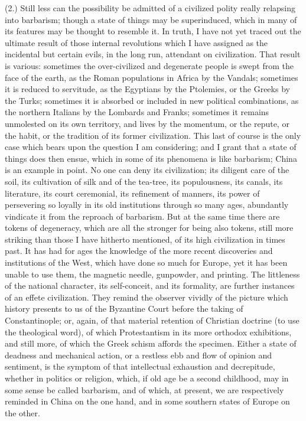 (2.) Still less can the
possibility be admitted of a civilized polity really relapsing into
barbarism; though a state of things may be superinduced, which in many
of its features may be thought to resemble it. In truth, I have not
yet traced out the ultimate result of those internal revolutions which
I have assigned as the incidental but certain evils, in the long run,
attendant on civilization. That result is various: sometimes the
over-civilized and degenerate people is swept from the face of the
earth, as the Roman populations in Africa by the Vandals; sometimes it
is reduced to servitude, as the Egyptians by the Ptolemies, or the
Greeks by the Turks; sometimes it is absorbed or included in new
political combinations, as the northern Italians by the Lombards and
Franks; sometimes it remains unmolested on its own territory, and
lives by the momentum, or the repute, or the habit, or the
tradition of its former civilization. This last of course is the only
case which bears upon the question I am considering; and I grant that
a state of things does then ensue, which in some of its phenomena is
like barbarism; China is an example in point. No one can deny its
civilization; its diligent care of the soil, its cultivation of silk
and of the tea-tree, its populousness, its canals, its literature, its
court ceremonial, its refinement of manners, its power of persevering
so loyally in its old institutions through so many ages, abundantly
vindicate it from the reproach of barbarism. But at the same time
there are tokens of degeneracy, which are all the stronger for being
also tokens, still more striking than those I have hitherto mentioned,
of its high civilization in times past. It has had for ages the
knowledge of the more recent discoveries and institutions of the West,
which have done so much for Europe, yet it has been unable to use
them, the magnetic needle, gunpowder, and printing. The littleness of
the national character, its self-conceit, and its formality, are
further instances of an effete civilization. They remind the observer
vividly of the picture which history presents to us of the Byzantine
Court before the taking of Constantinople; or, again, of that material
retention of Christian doctrine (to use the theological word), of
which Protestantism in its more orthodox exhibitions, and still more,
of which the Greek schism affords the specimen. Either a state of
deadness and mechanical action, or a restless ebb and flow of opinion
and sentiment, is the symptom of that intellectual exhaustion and
decrepitude, whether in politics or religion, which, if old age be a
second childhood, may in some sense be called barbarism, and of which,
at present, we are respectively reminded in China on the one
hand, and in some southern states of Europe on the other.

